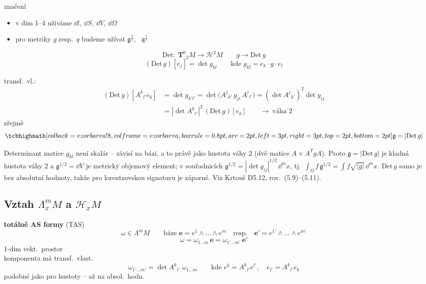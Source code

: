 značení
\begin{itemize}[nosep]
  \item[] v dim 1--4 užíváme \quad $\dd l,\ \dd S,\ \dd V,\ \dd\Omega$
  \item[] pro metriky $g$ resp.\ $q$ budeme užívat \quad $\mathfrak{g}^{\frac12}$, \ $\mathfrak{q}^{\frac12}$
\end{itemize}

\begin{definice}
\[
  \mathrm{Det}:\ \mathbf{T}^0{}_2M \to \mathcal{H}^2M \qquad g\to\mathrm{Det}\,g
\]
\[
  (\mathrm{Det}\,g)[e_j] = \det g_{kl} \qquad\text{kde } g_{kl} = e_k\cdot g\cdot e_l
\]
\end{definice}
transf.\ vl.:
\begin{align*}
  (\mathrm{Det}\,g)[A^k{}_{l'}e_k] &= \det g_{k'l'} = \det\big(A^j{}_{k'}\,g_{ji}\,A^i{}_{l'}\big) = (\det A^j{}_{k'})^2\det g_{ij} \\
  &= |\det A^k{}_{l'}|^2\,(\mathrm{Det}\,g)[e_k] \qquad\to\ \text{váha } 2
\end{align*}
zřejmě
\[
  \vzorec{\mathfrak{g} = |\mathrm{Det}\,g|}
\]

\begin{vysvetleni}
Determinant matice $g_{kl}$ není skalár -- závisí na bázi, a to právě jako hustota váhy $2$ (dvě matice $A$ v $A^TgA$).
Proto $\mathfrak g = |\mathrm{Det}\,g|$ je kladná hustota váhy $2$ a $\mathfrak g^{1/2} = \dd V$ je metrický objemový element; v souřadnicích
$\mathfrak g^{1/2} = |\det g_{ij}|^{1/2}\,\dd^m x$, tj.\ $\int_\Omega f\,\mathfrak g^{1/2} = \int f\sqrt{|g|}\,\dd^m x$.
$\mathrm{Det}\,g$ samo je bez absolutní hodnoty, takže pro lorentzovskou signaturu je záporné. Viz Krtouš D5.12, rov.~(5.9)--(5.11).
\end{vysvetleni}

\subsection{Vztah $\Lambda^m_xM$ a $\mathcal{H}_xM$}

\textbf{totálně AS formy} (TAS)
\[
  \omega\in\Lambda^mM \qquad\text{báze } \mathbf{e} = e^1\wedge\dots\wedge e^m
  \quad\text{resp.}\quad \mathbf{e}' = e^{1'}\wedge\dots\wedge e^{m'}
\]
\[
  \omega = \omega_{1\dots m}\,\mathbf{e} = \omega_{1'\dots m'}\,\mathbf{e}'
\]
1-dim vekt.\ prostor \\
komponenta má transf.\ vlast.
\[
  \omega_{1'\dots m'} = \det A^k{}_{l'}\;\omega_{1\dots m}
  \qquad\text{kde } e^k = A^k{}_{l'}e^{l'},\quad e_{l'} = A^k{}_{l'}e_k
\]
podobné jako pro hustoty -- až na absol.\ hodn.

